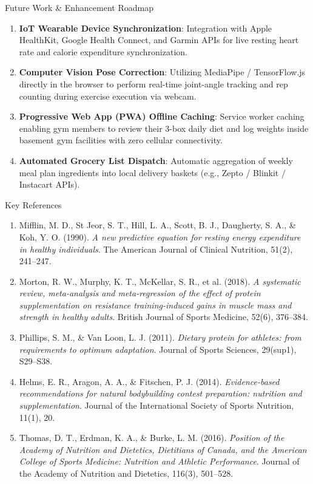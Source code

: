 \documentclass[aspectratio=169,10pt]{beamer}
\begin{document}
\begin{frame}{Future Work \& Enhancement Roadmap}
  \begin{enumerate}
    \item \textbf{IoT Wearable Device Synchronization}: Integration with Apple HealthKit, Google Health Connect, and Garmin APIs for live resting heart rate and calorie expenditure synchronization.
    \item \textbf{Computer Vision Pose Correction}: Utilizing MediaPipe / TensorFlow.js directly in the browser to perform real-time joint-angle tracking and rep counting during exercise execution via webcam.
    \item \textbf{Progressive Web App (PWA) Offline Caching}: Service worker caching enabling gym members to review their 3-box daily diet and log weights inside basement gym facilities with zero cellular connectivity.
    \item \textbf{Automated Grocery List Dispatch}: Automatic aggregation of weekly meal plan ingredients into local delivery baskets (e.g., Zepto / Blinkit / Instacart APIs).
  \end{enumerate}
\end{frame}

\begin{frame}{Key References}
  \scriptsize
  \begin{enumerate}
    \item Mifflin, M. D., St Jeor, S. T., Hill, L. A., Scott, B. J., Daugherty, S. A., \& Koh, Y. O. (1990). \textit{A new predictive equation for resting energy expenditure in healthy individuals}. The American Journal of Clinical Nutrition, 51(2), 241--247.
    \item Morton, R. W., Murphy, K. T., McKellar, S. R., et al. (2018). \textit{A systematic review, meta-analysis and meta-regression of the effect of protein supplementation on resistance training-induced gains in muscle mass and strength in healthy adults}. British Journal of Sports Medicine, 52(6), 376--384.
    \item Phillips, S. M., \& Van Loon, L. J. (2011). \textit{Dietary protein for athletes: from requirements to optimum adaptation}. Journal of Sports Sciences, 29(sup1), S29--S38.
    \item Helms, E. R., Aragon, A. A., \& Fitschen, P. J. (2014). \textit{Evidence-based recommendations for natural bodybuilding contest preparation: nutrition and supplementation}. Journal of the International Society of Sports Nutrition, 11(1), 20.
    \item Thomas, D. T., Erdman, K. A., \& Burke, L. M. (2016). \textit{Position of the Academy of Nutrition and Dietetics, Dietitians of Canada, and the American College of Sports Medicine: Nutrition and Athletic Performance}. Journal of the Academy of Nutrition and Dietetics, 116(3), 501--528.
  \end{enumerate}
\end{frame}
\end{document}

